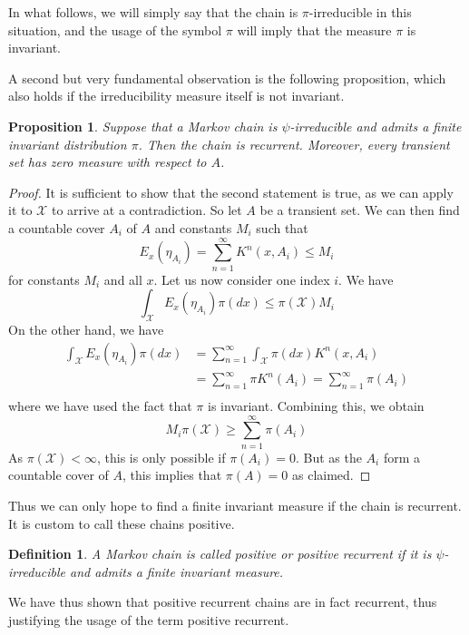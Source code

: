 \documentclass[a4paper, draft]{article}
\theoremstyle{own}
\newtheorem{prop}[thm]{Proposition}
\newtheorem{defn}{Definition}[section]
\theoremstyle{remark}
\begin{document}
In what follows, we will simply say that the chain is $\pi$-irreducible in this situation, and the usage of the symbol $\pi$ will imply that the measure $\pi$ is invariant. 

A second but very fundamental observation is the following proposition, which also holds if the irreducibility measure itself is not invariant.

\begin{prop}\label{prop:positiveimpliesrecurrent}
	Suppose that a Markov chain is $\psi$-irreducible and admits a finite invariant distribution $\pi$. Then the chain is recurrent. Moreover, every transient set has zero measure with respect to $A$.
\end{prop}

\begin{proof}
	It is sufficient to show that the second statement is true, as we can apply it to ${\mathcal X}$ to arrive at a contradiction. So let $A$ be a transient set. We can then find a countable cover $A_i$ of $A$ and constants $M_i$ such that 
	$$
	E_x(\eta_{A_i}) = \sum_{n=1}^\infty K^n(x,A_i) \leq M_i
	$$
	for constants $M_i$ and all $x$. 
	Let us now consider one index $i$. We have
	$$
	\int_{{\mathcal X}} E_x(\eta_{A_i}) \pi(dx) \leq \pi({\mathcal X}) M_i
	$$
	On the other hand, we have
	\begin{align*}
	\int_{{\mathcal X}} E_x(\eta_{A_i}) \pi(dx)   
	&= \sum_{n=1}^\infty \int_{{\mathcal X}} \pi(dx) K^n(x,A_i) \\
	&= \sum_{n=1}^\infty \pi K^n(A_i) 
	= \sum_{n=1}^\infty \pi(A_i) \\
	\end{align*}
	where we have used the fact that $\pi$ is invariant. Combining this, we obtain
	$$
	M_i \pi({\mathcal X}) \geq \sum_{n=1}^\infty \pi(A_i)
	$$
	As $\pi({\mathcal X}) < \infty$, this is only possible if $\pi(A_i) = 0$. But as the $A_i$ form a countable cover of $A$, this implies that $\pi(A) = 0$ as claimed.
\end{proof}

Thus we can only hope to find a finite invariant measure if the chain is recurrent. It is custom to call these chains positive.

\begin{defn}
	A Markov chain is called {\em positive} or {\em positive recurrent} if it is $\psi$-irreducible and admits a finite invariant measure. 
\end{defn}

We have thus shown that positive recurrent chains are in fact recurrent, thus justifying the usage of the term positive recurrent. 
\end{document}

